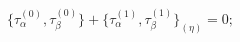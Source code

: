 \begin{equation}
 \{\tau^{(0)} _\alpha , \tau^{(0)} _\beta\}+ \{\tau^{(1)} _\alpha , \tau^{(1)}
  _\beta\}_{(\eta)}=0;
  \label{a8}
  \end{equation}

